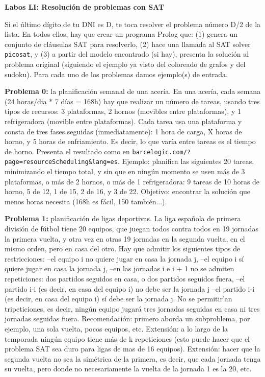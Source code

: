 \documentclass[11pt]{article}
\begin{document}
\thispagestyle{empty}

\begin{center}
{\Large\bf Labos LI: Resolución de problemas con SAT} \qquad 
\end{center}


Si el último dígito de tu DNI es D, te toca resolver el problema número D/2 de la lista.
En todos ellos, hay que crear un programa Prolog que: (1) genera un conjunto de cláusulas SAT
para resolverlo, (2) hace una llamada al SAT solver \texttt{picosat}, y (3) a partir del modelo
encontrado (si hay), presenta la solución al problema original (siguiendo el ejemplo ya visto del
coloreado de grafos y del sudoku). Para cada uno de los problemas damos ejemplo(s) de entrada.
\medskip

\textbf{Problema 0:} la planificación semanal de una acería. En una acería, cada semana (24 horas/dia *
7 días = 168h) hay que realizar un número de tareas, usando tres tipos de recursos: 3 plataformas,
2 hornos (movibles entre plataformas), y 1 refrigeradora (movible entre plataformas). Cada tarea
usa una plataforma y consta de tres fases seguidas (inmediatamente): 1 hora de carga, X horas de
horno, y 5 horas de enfriamiento. Es decir, lo que varía entre tareas es el tiempo de horno. Presenta
el resultado como en \texttt{barcelogic.com/?page=resourceScheduling\&lang=es}. Ejemplo: planifica
las siguientes 20 tareas, minimizando el tiempo total, y sin que en ningún momento se usen más
de 3 plataformas, o más de 2 hornos, o más de 1 refrigeradora: 9 tareas de 10 horas de horno, 5
de 12, 1 de 15, 2 de 16, y 3 de 22. Objetivo: encontrar la solución que menos horas necesita (168h es fácil,
150 también...).
\medskip


\textbf{Problema 1:} planificación de ligas deportivas. La liga española de primera división de fútbol tiene
20 equipos, que juegan todos contra todos en 19 jornadas la primera vuelta, y otra vez en otras
19 jornadas en la segunda vuelta, en el mismo orden, pero en casa del otro. Hay que admitir los
siguientes tipos de restricciones:
–el equipo i no quiere jugar en casa la jornada j,
–el equipo i sí quiere jugar en casa la jornada j,
–en las jornadas i e i + 1 no se admiten repeticiones: dos partidos seguidos en casa, o dos partidos
seguidos fuera,
–el partido i-i (es decir, en casa del equipo i) no debe ser la jornada j
–el partido i-i (es decir, en casa del equipo i) sí debe ser la jornada j.
No se permitir'an tripeticiones, es decir, ningún equipo jugará tres jornadas seguidas en casa ni tres
jornadas seguidas fuera. Recomendación: primero aborda un subproblema, por ejemplo, una sola
vuelta, pocos equipos, etc. Extensión: a lo largo de la temporada ningún equipo tiene
más de k repeticiones (esto puede hacer que el problema SAT sea duro para ligas de mas de 16
equipos). Extensión: hacer que la segunda vuelta no sea la simétrica
de la primera, es decir, que cada jornada tenga su vuelta, pero donde no necesariamente la vuelta
de la jornada 1 es la 20, etc. 
\medskip
\end{document}
